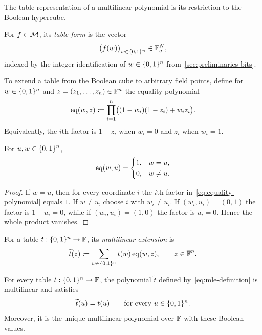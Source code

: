 The table representation of a multilinear polynomial is its restriction to the Boolean hypercube.

\begin{definition}
\label{def:table-form}
For $f\in\mathcal{M}$, its \emph{table form} is the vector
\[
  \bigl(f(w)\bigr)_{w\in\{0,1\}^n}\in\mathbb{F}_q^N,
\]
indexed by the integer identification of $w\in\{0,1\}^n$ from~\cref{sec:preliminaries-bits}.
\end{definition}

To extend a table from the Boolean cube to arbitrary field points, define for $w\in\{0,1\}^n$ and $z=(z_1,\ldots,z_n)\in\mathbb{F}^n$ the equality polynomial
\begin{equation}
  \operatorname{eq}(w,z)
  \coloneqq
  \prod_{i=1}^{n}\bigl((1-w_i)(1-z_i)+w_iz_i\bigr).
  \label{eq:equality-polynomial}
\end{equation}
Equivalently, the $i$th factor is $1-z_i$ when $w_i=0$ and $z_i$ when $w_i=1$.

\begin{lemma}
\label{lem:eq-delta}
For $u,w\in\{0,1\}^n$,
\[
  \operatorname{eq}(w,u)=
  \begin{cases}
    1,&w=u,\\
    0,&w\ne u.
  \end{cases}
\]
\end{lemma}

\begin{proof}
If $w=u$, then for every coordinate $i$ the $i$th factor in~\eqref{eq:equality-polynomial} equals $1$.  If $w\ne u$, choose $i$ with $w_i\ne u_i$.  If $(w_i,u_i)=(0,1)$ the factor is $1-u_i=0$, while if $(w_i,u_i)=(1,0)$ the factor is $u_i=0$.  Hence the whole product vanishes.
\end{proof}

\begin{definition}
\label{def:mle}
For a table $t:\{0,1\}^n\to\mathbb{F}$, its \emph{multilinear extension} is
\begin{equation}
  \widetilde t(z)
  \coloneqq
  \sum_{w\in\{0,1\}^n}t(w)\operatorname{eq}(w,z),
  \qquad z\in\mathbb{F}^n.
  \label{eq:mle-definition}
\end{equation}
\end{definition}

\begin{proposition}
\label{prop:boolean-interpolation}
For every table $t:\{0,1\}^n\to\mathbb{F}$, the polynomial $\widetilde t$ defined by~\eqref{eq:mle-definition} is multilinear and satisfies
\[
  \widetilde t(u)=t(u)
  \qquad\text{for every }u\in\{0,1\}^n.
\]
Moreover, it is the unique multilinear polynomial over $\mathbb{F}$ with these Boolean values.
\end{proposition}

